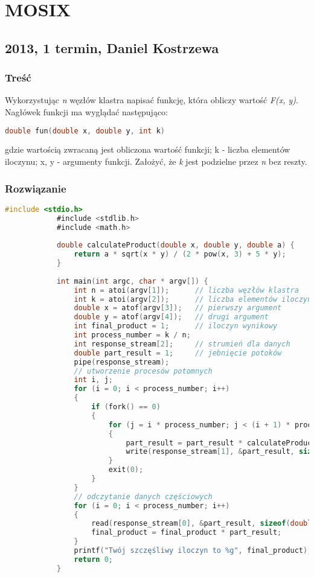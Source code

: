 \newpage
\section{MOSIX}
	\subsection{2013, 1 termin, Daniel Kostrzewa}
		\subsubsection{Treść}
		Wykorzystując \textit{n} węzłów klastra napisać funkcję, która obliczy wartość \textit{F(x, y)}. Nagłówek funkcji ma wyglądać następująco:
		\begin{lstlisting}[language=C]
			double fun(double x, double y, int k)
		\end{lstlisting}
		gdzie wartością zwracaną jest obliczona wartość funkcji; k - liczba elementów iloczynu; x, y - argumenty funkcji. Założyć, że \textit{k} jest podzielne przez \textit{n} bez reszty.
	\subsubsection{Rozwiązanie}
		\begin{lstlisting}[language=C]
			#include <stdio.h>
			#include <stdlib.h>
			#include <math.h>
			
			double calculateProduct(double x, double y, double a) {
				return a * sqrt(x * y) / (2 * pow(x, 3) + 5 * y);
			}
			
			int main(int argc, char * argv[]) {
				int n = atoi(argv[1]);		// liczba węzłów klastra
				int k = atoi(argv[2]);		// liczba elementów iloczynu
				double x = atof(argv[3]);	// pierwszy argument
				double y = atof(argv[4]);	// drugi argument
				int final_product = 1;		// iloczyn wynikowy
				int process_number = k / n;
				int response_stream[2];		// strumień dla danych
				double part_result = 1;		// jebnięcie potoków
				pipe(response_stream);
				// utworzenie procesów potomnych
				int i, j;
				for (i = 0; i < process_number; i++)
				{
					if (fork() == 0)
					{
						for (j = i * process_number; j < (i + 1) * process_number; j++)
						{
							part_result = part_result * calculateProduct(x, y, j);
							write(response_stream[1], &part_result, sizeof(double));
						}
						exit(0);
					}
				}
				// odczytanie danych częściowych
				for (i = 0; i < process_number; i++)
				{
					read(response_stream[0], &part_result, sizeof(double));
					final_product = final_product * part_result;
				}
				printf("Twój szczęśliwy iloczyn to %g", final_product);
				return 0;
			}
		\end{lstlisting}
